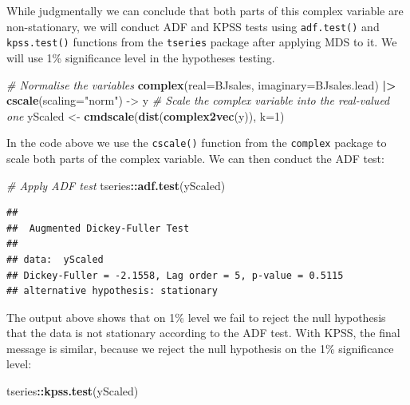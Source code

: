 \documentclass[
]{book}
\newenvironment{Shaded}{\begin{snugshade}}{\end{snugshade}}
\newcommand{\CommentTok}[1]{\textcolor[rgb]{0.56,0.35,0.01}{\textit{#1}}}
\newcommand{\DataTypeTok}[1]{\textcolor[rgb]{0.13,0.29,0.53}{#1}}
\newcommand{\DecValTok}[1]{\textcolor[rgb]{0.00,0.00,0.81}{#1}}
\newcommand{\ErrorTok}[1]{\textcolor[rgb]{0.64,0.00,0.00}{\textbf{#1}}}
\newcommand{\KeywordTok}[1]{\textcolor[rgb]{0.13,0.29,0.53}{\textbf{#1}}}
\newcommand{\NormalTok}[1]{#1}
\newcommand{\OperatorTok}[1]{\textcolor[rgb]{0.81,0.36,0.00}{\textbf{#1}}}
\newcommand{\StringTok}[1]{\textcolor[rgb]{0.31,0.60,0.02}{#1}}
\begin{document}
While judgmentally we can conclude that both parts of this complex variable are non-stationary, we will conduct ADF and KPSS tests using \texttt{adf.test()} and \texttt{kpss.test()} functions from the \texttt{tseries} package after applying MDS to it. We will use 1\% significance level in the hypotheses testing.

\begin{Shaded}
\begin{Highlighting}[]
\CommentTok{\# Normalise the variables}
\KeywordTok{complex}\NormalTok{(}\DataTypeTok{real=}\NormalTok{BJsales, }\DataTypeTok{imaginary=}\NormalTok{BJsales.lead) }\OperatorTok{|}\ErrorTok{\textgreater{}}
\StringTok{    }\KeywordTok{cscale}\NormalTok{(}\DataTypeTok{scaling=}\StringTok{"norm"}\NormalTok{) {-}\textgreater{}}\StringTok{ }\NormalTok{y}
\CommentTok{\# Scale the complex variable into the real{-}valued one}
\NormalTok{yScaled \textless{}{-}}\StringTok{ }\KeywordTok{cmdscale}\NormalTok{(}\KeywordTok{dist}\NormalTok{(}\KeywordTok{complex2vec}\NormalTok{(y)), }\DataTypeTok{k=}\DecValTok{1}\NormalTok{)}
\end{Highlighting}
\end{Shaded}

In the code above we use the \texttt{cscale()} function from the \texttt{complex} package to scale both parts of the complex variable. We can then conduct the ADF test:

\begin{Shaded}
\begin{Highlighting}[]
\CommentTok{\# Apply ADF test}
\NormalTok{tseries}\OperatorTok{::}\KeywordTok{adf.test}\NormalTok{(yScaled)}
\end{Highlighting}
\end{Shaded}

\begin{verbatim}
## 
##  Augmented Dickey-Fuller Test
## 
## data:  yScaled
## Dickey-Fuller = -2.1558, Lag order = 5, p-value = 0.5115
## alternative hypothesis: stationary
\end{verbatim}

The output above shows that on 1\% level we fail to reject the null hypothesis that the data is not stationary according to the ADF test. With KPSS, the final message is similar, because we reject the null hypothesis on the 1\% significance level:

\begin{Shaded}
\begin{Highlighting}[]
\NormalTok{tseries}\OperatorTok{::}\KeywordTok{kpss.test}\NormalTok{(yScaled)}
\end{Highlighting}
\end{Shaded}
\end{document}
